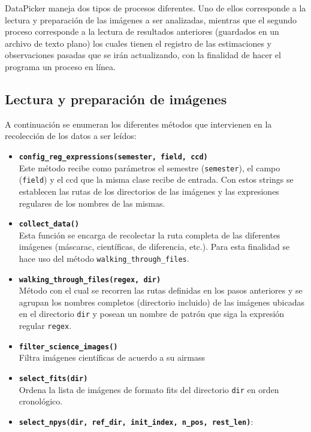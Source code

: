 DataPicker maneja dos tipos de procesos diferentes. Uno de ellos corresponde a la lectura y preparaci\'on de las im\'agenes a ser analizadas, mientras que el segundo proceso corresponde a la lectura de resultados anteriores (guardados en un archivo de texto plano) los cuales tienen el registro de las estimaciones y observaciones pasadas que se ir\'an actualizando, con la finalidad de hacer el programa un proceso en l\'inea.
\bigskip
  
\subsection{Lectura y preparaci\'on de im\'agenes}
A continuaci\'on se enumeran los diferentes m\'etodos que intervienen en la recolecci\'on de los datos a ser le\'idos:

\begin{itemize}
\item \textbf{\texttt{config\_reg\_expressions(semester, field, ccd)}}\\
Este m\'etodo recibe como par\'ametros el semestre (\texttt{semester}), el campo (\texttt{field}) y el ccd que la misma clase recibe de entrada. Con estos strings se establecen las rutas de los directorios de las im\'agenes y las expresiones regulares de los nombres de las mismas.
\item \textbf{\texttt{collect\_data()}}\\
Esta funci\'on se encarga de recolectar la ruta completa de las diferentes im\'agenes (m\'ascarac, cient\'ificas, de diferencia, etc.). Para esta finalidad se hace uso del m\'etodo \texttt{walking\_through\_files}. 
\item \textbf{\texttt{walking\_through\_files(regex, dir)}}\\
M\'etodo con el cual se recorren las rutas definidas en los pasos anteriores y se agrupan los nombres completos (directorio incluido) de las im\'agenes ubicadas en el directorio \texttt{dir} y posean un nombre de patr\'on que siga la expresi\'on regular \texttt{regex}.
\item \textbf{\texttt{filter\_science\_images()}}\\
Filtra im\'agenes cient\'ificas de acuerdo a su airmass 
\item \textbf{\texttt{select\_fits(dir)}}\\
Ordena la lista de im\'agenes de formato fits del directorio \texttt{dir} en orden cronol\'ogico.
\item \textbf{\texttt{select\_npys(dir, ref\_dir, init\_index, n\_pos, rest\_len)}}:\\
\end{itemize}

